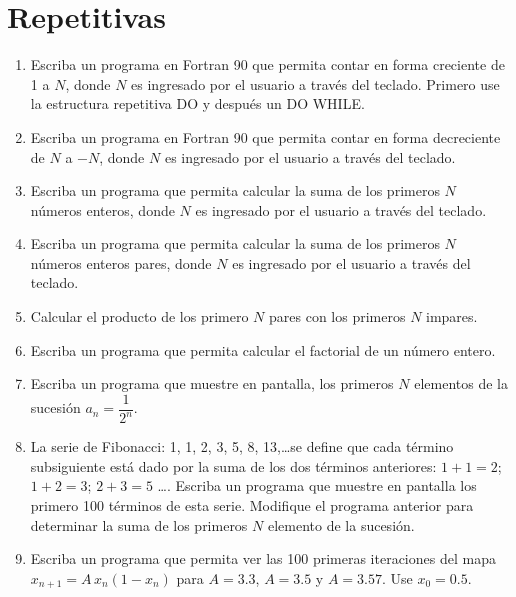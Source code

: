 \documentclass[11pt]{exam}
\begin{document}
\section{Repetitivas}
\begin{enumerate}
 \item 
Escriba un programa en Fortran 90 que permita contar en forma creciente de 1 a $N$, donde $N$ es 
ingresado por el usuario a trav\'es del teclado. Primero use la estructura repetitiva DO y despu\'es un DO WHILE.

\item 
Escriba un programa en Fortran 90 que permita contar en forma decreciente de $N$ a $-N$, 
donde $N$ es ingresado por el usuario a trav\'es del teclado.

\item 
Escriba un programa que permita calcular la suma de los primeros $N$ n\'umeros enteros, 
donde $N$ es ingresado por el usuario a trav\'es del teclado.

\item 
Escriba un programa que permita calcular la suma de los primeros $N$ n\'umeros enteros pares, donde $N$ es ingresado por el usuario a trav\'es del teclado.

\item 
Calcular el producto de los primero $N$ pares con los primeros $N$ impares.

\item 
Escriba un programa que permita calcular el factorial de un n\'umero entero.
\item 
Escriba un programa  que muestre en pantalla, los primeros $N$ elementos de la sucesi\'on $a_{n}=\dfrac{1}{2^{n}}$.

\item 
La serie de Fibonacci: 1, 1, 2, 3, 5, 8, 13,\dots se define que cada t\'ermino subsiguiente 
 est\'a dado por la suma de los dos t\'erminos anteriores: $1+1=2$;  $1+2=3$;  $2+3= 5$ \dots . Escriba un programa que muestre en pantalla los primero 100 t\'erminos de esta serie.
Modifique el programa anterior para determinar la suma de los primeros $N$ elemento de la sucesi\'on.
\item 
Escriba un programa  que permita ver las 100 primeras iteraciones del mapa
$x_{n+1}=A\,x_{n}(1-x_{n}) $  para $A= 3.3$,  $A= 3.5$   y  $A=3. 57$. Use $x_{0}= 0.5$.

\end{enumerate}
\end{document}
